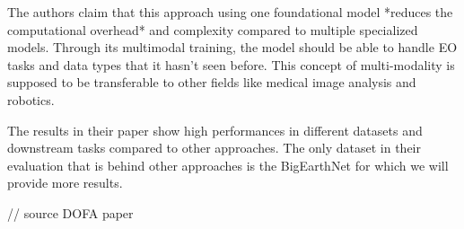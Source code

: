 The authors claim that this approach using one foundational model *reduces the computational overhead* and complexity compared to multiple specialized models. Through its multimodal training, the model should be able to handle EO tasks and data types that it hasn't seen before. This concept of multi-modality is supposed to be transferable to other fields like medical image analysis and robotics.

The results in their paper show high performances in different datasets and downstream tasks compared to other approaches. The only dataset in their evaluation that is behind other approaches is the BigEarthNet for which we will provide more results.

// source DOFA paper
